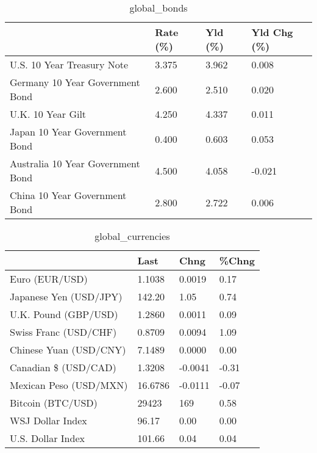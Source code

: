 \documentclass{article}%
\begin{document}
%


\begin{table}[htbp]%
\caption{global\_bonds}%
\centering%
\begin{adjustbox}{width=1\textwidth}%
\begin{tabular}{llll}
\toprule
                                  & Rate (\%) & Yld (\%) & Yld Chg (\%) \\
\midrule
       U.S. 10 Year Treasury Note &    3.375 &   3.962 &       0.008 \\
  Germany 10 Year Government Bond &    2.600 &   2.510 &       0.020 \\
                U.K. 10 Year Gilt &    4.250 &   4.337 &       0.011 \\
    Japan 10 Year Government Bond &    0.400 &   0.603 &       0.053 \\
Australia 10 Year Government Bond &    4.500 &   4.058 &      -0.021 \\
    China 10 Year Government Bond &    2.800 &   2.722 &       0.006 \\
\bottomrule
\end{tabular}
%
\end{adjustbox}%
\end{table}

%


\begin{table}[htbp]%
\caption{global\_currencies}%
\centering%
\begin{adjustbox}{width=1\textwidth}%
\begin{tabular}{llll}
\toprule
                       &    Last &    Chng & \%Chng \\
\midrule
        Euro (EUR/USD) &  1.1038 &  0.0019 &  0.17 \\
Japanese Yen (USD/JPY) &  142.20 &    1.05 &  0.74 \\
  U.K. Pound (GBP/USD) &  1.2860 &  0.0011 &  0.09 \\
 Swiss Franc (USD/CHF) &  0.8709 &  0.0094 &  1.09 \\
Chinese Yuan (USD/CNY) &  7.1489 &  0.0000 &  0.00 \\
  Canadian \$ (USD/CAD) &  1.3208 & -0.0041 & -0.31 \\
Mexican Peso (USD/MXN) & 16.6786 & -0.0111 & -0.07 \\
     Bitcoin (BTC/USD) &   29423 &     169 &  0.58 \\
      WSJ Dollar Index &   96.17 &    0.00 &  0.00 \\
     U.S. Dollar Index &  101.66 &    0.04 &  0.04 \\
\bottomrule
\end{tabular}
%
\end{adjustbox}%
\end{table}
\end{document}
